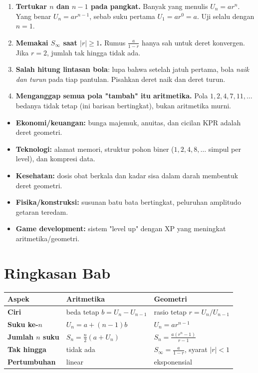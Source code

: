 \documentclass[11pt,a4paper]{report}
\theoremstyle{gaya}
\begin{document}
\begin{kesalahan}
\begin{enumerate}[leftmargin=*,topsep=2pt]
  \item \textbf{Tertukar $n$ dan $n-1$ pada pangkat.} Banyak yang menulis $U_n=ar^n$. Yang benar $U_n=ar^{n-1}$, sebab suku pertama $U_1=ar^0=a$. Uji selalu dengan $n=1$.
  \item \textbf{Memakai $S_\infty$ saat $|r|\ge 1$.} Rumus $\tfrac{a}{1-r}$ hanya sah untuk deret konvergen. Jika $r=2$, jumlah tak hingga tidak ada.
  \item \textbf{Salah hitung lintasan bola}: lupa bahwa setelah jatuh pertama, bola \emph{naik dan turun} pada tiap pantulan. Pisahkan deret naik dan deret turun.
  \item \textbf{Menganggap semua pola "tambah" itu aritmetika.} Pola $1,2,4,7,11,\dots$ bedanya tidak tetap (ini barisan bertingkat), bukan aritmetika murni.
\end{enumerate}
\end{kesalahan}

\begin{dunianyata}
\begin{itemize}[leftmargin=*,topsep=2pt]
  \item \textbf{Ekonomi/keuangan:} bunga majemuk, anuitas, dan cicilan KPR adalah deret geometri.
  \item \textbf{Teknologi:} alamat memori, struktur pohon biner ($1,2,4,8,\dots$ simpul per level), dan kompresi data.
  \item \textbf{Kesehatan:} dosis obat berkala dan kadar sisa dalam darah membentuk deret geometri.
  \item \textbf{Fisika/konstruksi:} susunan batu bata bertingkat, peluruhan amplitudo getaran teredam.
  \item \textbf{Game development:} sistem "level up" dengan XP yang meningkat aritmetika/geometri.
\end{itemize}
\end{dunianyata}

\section*{Ringkasan Bab}
\begin{center}
\begin{tabular}{>{\bfseries}p{3cm} p{5.3cm} p{5.3cm}}
\toprule
Aspek & Aritmetika & Geometri \\
\midrule
Ciri & beda tetap $b=U_n-U_{n-1}$ & rasio tetap $r=U_n/U_{n-1}$ \\
Suku ke-$n$ & $U_n=a+(n-1)b$ & $U_n=ar^{n-1}$ \\
Jumlah $n$ suku & $S_n=\tfrac n2(a+U_n)$ & $S_n=\tfrac{a(r^n-1)}{r-1}$ \\
Tak hingga & tidak ada & $S_\infty=\tfrac{a}{1-r}$, syarat $|r|<1$ \\
Pertumbuhan & linear & eksponensial \\
\bottomrule
\end{tabular}
\end{center}
\end{document}

